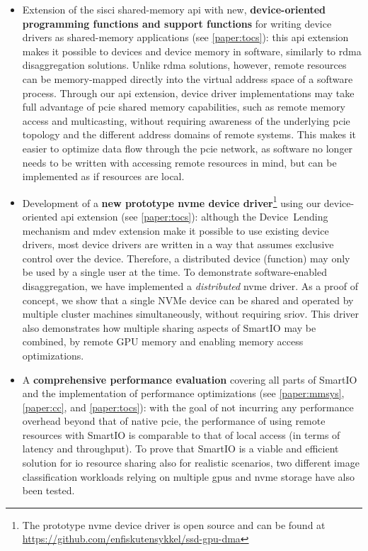 \begin{itemize}
    \item Extension of the \gls{sisci} shared-memory \gls{api} with new, \textbf{device-oriented programming functions and support functions} for writing device drivers as shared-memory applications (see \cref{paper:tocs}):
	this \gls{api} extension makes it possible to  devices and device memory in software, similarly to \gls{rdma} \gls{disaggregation} solutions.
	Unlike \gls{rdma} solutions, however, remote resources can be memory-mapped directly into the virtual address space of a software process.
	Through our \gls{api} extension, device driver implementations may take full advantage of \gls{pcie} shared memory capabilities, such as remote memory access and multicasting, without requiring awareness of the underlying \gls{pcie} topology and the different address domains of remote systems.
	This makes it easier to optimize data flow through the \gls{pcie} network, as software no longer needs to be written with accessing remote resources in mind, but can be implemented as if resources are local.

    \item Development of a \textbf{new prototype \gls{nvme} device driver}\footnote{The prototype \gls{nvme} device driver is open source and can be found at \mbox{\url{https://github.com/enfiskutensykkel/ssd-gpu-dma}}} using our device-oriented \gls{api} extension (see \cref{paper:tocs}):
    although the Device~Lending mechanism and \gls{mdev} extension make it possible to use existing device drivers, most device drivers are written in a way that assumes exclusive control over the device. Therefore, a distributed device (function) may only be used by a single user at the time.
    To demonstrate software-enabled \gls{disaggregation}, we have implemented a \emph{distributed} \gls{nvme} driver. 
    As a proof of concept, we show that a single NVMe device can be shared and operated by multiple cluster machines simultaneously, without requiring \gls{sriov}.
	This driver also demonstrates how multiple sharing aspects of SmartIO may be combined, 
	by  remote GPU memory and enabling memory access optimizations.

    \item A \textbf{comprehensive performance evaluation} covering all parts of SmartIO and the implementation of performance optimizations (see \cref{paper:mmsys}, \cref{paper:cc}, and \cref{paper:tocs}):
        with the goal of not incurring any performance overhead beyond that of native \gls{pcie}, the performance of using remote resources with SmartIO is comparable to that of local access (in terms of latency and throughput).
        To prove that SmartIO is a viable and efficient solution for \gls{io} resource sharing also for realistic scenarios, two different image classification workloads relying on multiple \glspl{gpu} and \gls{nvme} storage have also been tested.
	
\end{itemize}
